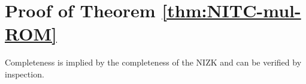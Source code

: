 
\section{Proof of Theorem \ref{thm:NITC-mul-ROM}} %
\label{app:NITC-mul-ROM}

Completeness is implied by the completeness of the NIZK and can be verified by inspection. 



%
%
%
%
%



